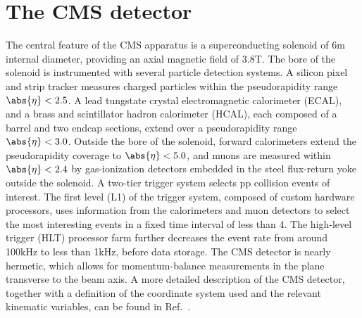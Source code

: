 \section{The CMS detector}
\label{sec:detector}


The central feature of the CMS apparatus is a superconducting solenoid
of 6\unit{m} internal diameter, providing an axial magnetic field of
3.8\unit{T}. The bore of the solenoid is instrumented with several
particle detection systems. A silicon pixel and strip tracker measures
charged particles within the pseudorapidity range $\abs{\eta} < 2.5$.
A lead tungstate crystal electromagnetic calorimeter (ECAL), and a
brass and scintillator hadron calorimeter (HCAL), each composed of a
barrel and two endcap sections, extend over a pseudorapidity range
$\abs{\eta} < 3.0$. %
Outside the bore of the solenoid, forward calorimeters extend the
pseudorapidity coverage to $\abs{\eta} < 5.0$, and muons are measured
within $\abs{\eta} < 2.4$ by gas-ionization detectors embedded in the
steel flux-return yoke outside the solenoid. A two-tier trigger system
selects pp collision events of interest. The first level (L1) of the
trigger system, composed of custom hardware processors, uses
information from the calorimeters and muon detectors to select the
most interesting events in a fixed time interval of less than
4\mus. The high-level trigger (HLT) processor farm further decreases
the event rate from around 100\unit{kHz} to less than 1\unit{kHz},
before data storage. The CMS detector is nearly hermetic, which allows
for momentum-balance measurements in the plane transverse to the beam
axis. A more detailed description of the CMS detector, together with a
definition of the coordinate system used and the relevant kinematic
variables, can be found in Ref.~\cite{Chatrchyan:2008zzk}.
